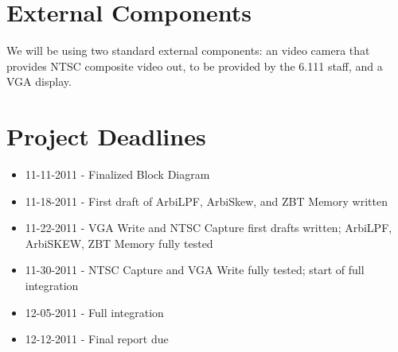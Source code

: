 \documentclass[10pt]{article}
\begin{document}
\section{External Components}
We will be using two standard external components: an video camera that provides NTSC composite video out, to be provided by the 6.111 staff, and a VGA display.

\section{Project Deadlines}
\begin{itemize}
\item 11-11-2011 - Finalized Block Diagram
\item 11-18-2011 - First draft of ArbiLPF, ArbiSkew, and ZBT Memory written
\item 11-22-2011 - VGA Write and NTSC Capture first drafts written; ArbiLPF, ArbiSKEW, ZBT Memory fully tested
\item 11-30-2011 - NTSC Capture and VGA Write fully tested; start of full integration
\item 12-05-2011 - Full integration
\item 12-12-2011 - Final report due
\end{itemize}
\end{document}
